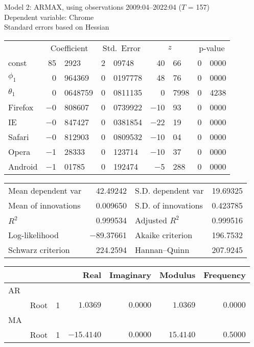 \documentclass[11pt]{article}
\begin{document}
\thispagestyle{empty}

\begin{center}

Model 2: ARMAX, using observations 2009:04--2022:04 ($T$ = 157)\\
Dependent variable: Chrome\\
Standard errors based on Hessian

\vspace{1em}

\begin{tabular}{lr@{.}lr@{.}lr@{.}lr@{.}l}
  &
 \multicolumn{2}{c}{Coefficient} &
  \multicolumn{2}{c}{Std.\ Error} &
   \multicolumn{2}{c}{$z$} &
    \multicolumn{2}{c}{p-value} \\[1ex]
const &
  85&2923 &
    2&09748 &
      40&66 &
        0&0000 \\
$\phi_{1}$ &
  0&964369 &
    0&0197778 &
      48&76 &
        0&0000 \\
$\theta_{1}$ &
  0&0648759 &
    0&0811135 &
      0&7998 &
        0&4238 \\
Firefox &
  $-$0&808607 &
    0&0739922 &
      $-$10&93 &
        0&0000 \\
IE &
  $-$0&847427 &
    0&0381854 &
      $-$22&19 &
        0&0000 \\
Safari &
  $-$0&812903 &
    0&0809532 &
      $-$10&04 &
        0&0000 \\
Opera &
  $-$1&28333 &
    0&123714 &
      $-$10&37 &
        0&0000 \\
Android &
  $-$1&01785 &
    0&192474 &
      $-$5&288 &
        0&0000 \\
\end{tabular}

\vspace{1ex}
\begin{tabular}{lrlr}
Mean dependent var &  42.49242 & S.D. dependent var &  19.69325 \\
Mean of innovations &  0.009650 & S.D. of innovations &  0.423785 \\
$R^2$ &  0.999534 & Adjusted $R^2$ &  0.999516 \\
Log-likelihood & $-$89.37661 & Akaike criterion &  196.7532 \\
Schwarz criterion &  224.2594 & Hannan--Quinn &  207.9245 \\
\end{tabular}


\vspace{1em}

\begin{tabular}{llrrrrr}
& & & Real & Imaginary & Modulus & Frequency \\ \hline
AR \\ 
& Root & 1 & $1.0369$ & $0.0000$ & $1.0369$ & $0.0000$ \\ 
MA \\ 
& Root & 1 & $-15.4140$ & $0.0000$ & $15.4140$ & $0.5000$ \\ \hline
\end{tabular}

\end{center}
\end{document}
